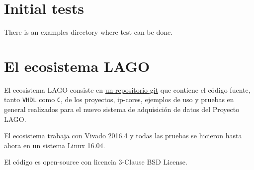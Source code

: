 \documentclass[a4paper,11pt]{article}
\begin{document}
\section{Initial tests}
There is an examples directory where test can be done.


\section{El ecosistema LAGO}
El ecosistema LAGO consiste en
\href{https://github.com/lagoprojectrp/lago\_ecosystem}{un repositorio git} que
contiene el código fuente, tanto \texttt{VHDL} como \texttt{C}, de los proyectos,
ip-cores, ejemplos de uso y pruebas en general realizados para el nuevo sistema de
adquisición de datos del Proyecto LAGO. 

El ecosistema trabaja con Vivado 2016.4
y todas las pruebas se hicieron hasta ahora en un sistema Linux 16.04.
  
El código es open-source con licencia 3-Clause BSD License.

\end{document}
